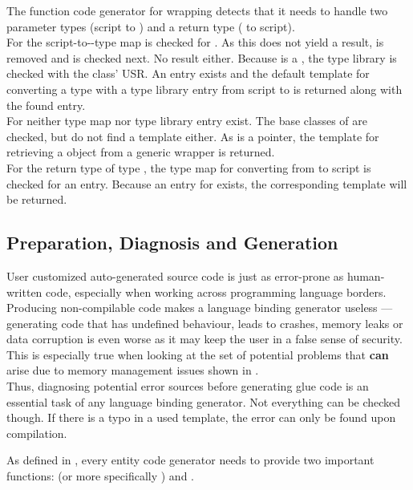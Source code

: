 The function code generator for wrapping  detects that it needs to handle two parameter types (script to ) and a return type ( to script).\\
For  the script-to--type map is checked for . As this does not yield a result,  is removed and  is checked next. No result either. Because  is a , the type library is checked with the class' USR. An entry exists and the default template for converting a type with a type library entry from script to  is returned along with the found entry.\\
For  neither type map nor type library entry exist. The base classes of  are checked, but do not find a template either. As  is a pointer, the template for retrieving a  object from a generic wrapper is returned.\\
For the return type of type , the type map for converting from  to script is checked for an entry. Because an entry for  exists, the corresponding template will be returned.

\subsection{Preparation, Diagnosis and Generation}

User customized auto-generated source code is just as error-prone as human-written code, especially when working across programming language borders. Producing \linebreak non-compilable code makes a language binding generator useless --- generating code that has undefined behaviour, leads to crashes, memory leaks or data corruption is even worse as it may keep the user in a false sense of security. This is especially true when looking at the set of potential problems that \textbf{can} arise due to memory management issues shown in .\\
Thus, diagnosing potential error sources before generating glue code is an essential task of any language binding generator. Not everything can be checked though. If there is a typo in a used template, the error can only be found upon compilation.

As defined in , every entity code generator needs to \linebreak provide two important functions:  (or more specifically \linebreak{}) and .

